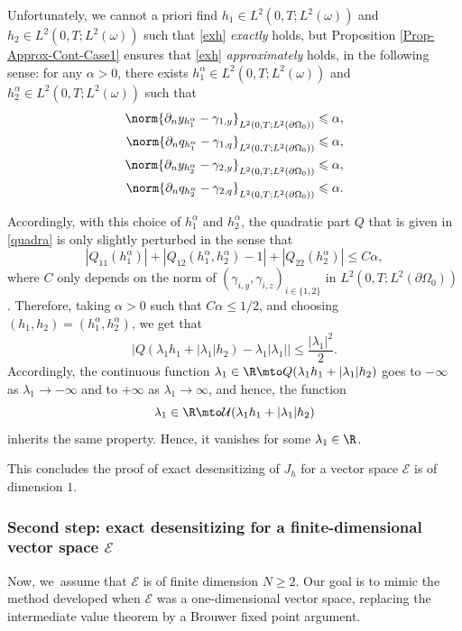 Unfortunately, we cannot a priori find $h_1\!\in\! L^2(0,T; L^2(\omega))$ and $h_2\!\in\! L^2(0,T; L^2(\omega))$ such that \eqref{exh} \textit{exactly} holds, but Proposition \ref{Prop-Approx-Cont-Case1} ensures that \eqref{exh} \textit{approximately} holds, in the following sense: for any ${\alpha}>0$, there exists $h_1^{\alpha} \in L^2(0,T; L^2(\omega))$ and $h_2^{\alpha} \in L^2(0,T; L^2(\omega))$ such that
\begin{equation*}
\begin{aligned}
\norm{\partial_{n} y_{h_1^{\alpha}}-\gamma_{1,y}}_{L^2(0,T; L^2(\partial \Omega_0))}\leqslant {\alpha},
\\
\norm{\partial_{n} q_{h_1^{\alpha}}-\gamma_{1,q}}_{L^2(0,T; L^2(\partial \Omega_0))}\leqslant {\alpha},
\\
\norm{\partial_{n} y_{h_2^{\alpha}}-\gamma_{2,y}}_{L^2(0,T; L^2(\partial \Omega_0))}\leqslant {\alpha},
\\
\norm{\partial_{n} q_{h_2^{\alpha}}-\gamma_{2,q}}_{L^2(0,T; L^2(\partial \Omega_0))}\leqslant {\alpha}.
\end{aligned}
\end{equation*}

Accordingly, with this choice of $h_1^{\alpha}$ and $h_2^{\alpha}$, the quadratic part $Q$ that is given in \eqref{quadra} is only slightly perturbed in the sense that
\[
|Q_{11}(h_1^{\alpha})| +|Q_{12}(h_1^{\alpha},h_2^{\alpha}) -1| + |Q_{22} (h_2^{\alpha})| \leq C {\alpha},
\]
where $C$ only depends on the norm of $(\gamma_{i,y}, \gamma_{i,z})_{i \in \{1,2\}}$ in $L^2(0,T; L^2(\partial \Omega_0))$. Therefore, taking ${\alpha} >0$ such that $C {\alpha} \leq 1/2$, and choosing $(h_1, h_2) = (h_1^{\alpha}, h_2^{\alpha})$, we get that
\[
|Q(\lambda_1h_1 +|\lambda_1|h_2) - \lambda_1 |\lambda_1| | \leq \frac{|\lambda_1|^2}{2}.
\]
Accordingly, the continuous function $\lambda_1 \in \R \mto Q(\lambda_1h_1 +|\lambda_1|h_2)$ goes to $-\infty$ as $\lambda_1 \to -\infty$ and to $+ \infty$ as $\lambda_1 \to \infty$, and hence, the function
\[
\lambda_1 \in \R \mto \mathcal{U}(\lambda_1 h_1+|\lambda_1| h_2)
\]
inherits the same property. Hence, it vanishes for some $\lambda_1 \in \R$.

This concludes the proof of exact desensitizing of $J_h$ for a vector space $\mathcal{E}$ is of dimension $1$.

\subsubsection*{Second step: exact desensitizing for a finite-dimensional vector space $\mathcal{E}$} Now, we~assu\-me that $\mathcal{E}$ is of finite dimension $N\geqslant 2$. Our goal is to mimic the method developed when $\mathcal{E}$ was a one-dimensional vector space, replacing the intermediate value theorem by a Brouwer fixed point argument.

